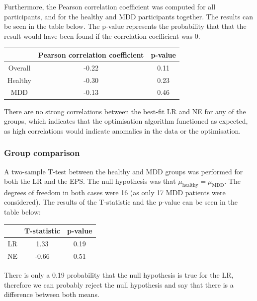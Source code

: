 \documentclass[12pt]{article}
\begin{document}
Furthermore, the Pearson correlation coefficient was computed for all participants, and for the healthy and MDD participants together. The results can be seen in the table below. The p-value represents the probability that that the result would have been found if the correlation coefficient was 0.

\begin{center}
 \begin{tabular}{|c || c | c |} 
 \hline
  & Pearson correlation coefficient & p-value  \\ [0.5ex] 
 \hline\hline
 Overall & -0.22 & 0.11 \\ 
 \hline
 Healthy & -0.30 & 0.23 \\
 \hline
 MDD & -0.13 & 0.46 \\ [1ex] 
 \hline
\end{tabular}
\end{center}

There are no strong correlations between the best-fit LR and NE for any of the groups, which indicates that the optimisation algorithm functioned as expected, as high correlations would indicate anomalies in the data or the optimisation. 

\subsubsection{Group comparison}

A two-sample T-test between the healthy and MDD groups was performed for both the LR and the EPS. The null hypothesis was that $\mu_{\mathrm{healthy}} = \mu_{\mathrm{MDD}}$. The degrees of freedom in both cases were 16 (as only 17 MDD patients were considered). The results of the T-statistic and the p-value can be seen in the table below:

\begin{center}
 \begin{tabular}{|c || c | c |} 
 \hline
  & T-statistic & p-value  \\ [0.5ex] 
 \hline\hline
 LR & 1.33 & 0.19 \\
 \hline
 NE & -0.66 & 0.51 \\ [1ex] 
 \hline
\end{tabular}
\end{center}

There is only a 0.19 probability that the null hypothesis is true for the LR, therefore we can probably reject the null hypothesis and say that there is a difference between both means.
\end{document}
